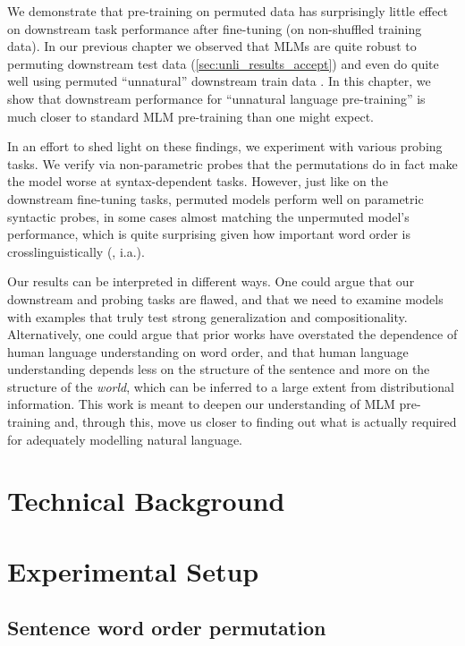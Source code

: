 \documentclass[letterpaper, 12pt]{report}
\begin{document}
We demonstrate that pre-training on permuted data has surprisingly little effect on downstream task performance after fine-tuning (on non-shuffled training data).
In our previous chapter we observed that MLMs are quite robust to permuting downstream test data (\autoref{sec:unli_results_accept}) and even do quite well using permuted ``unnatural'' downstream train data \cite{sinha2020b,gupta-etal-2021-bert}. In this chapter, we show that downstream performance for ``unnatural language pre-training'' is much closer to standard MLM pre-training than one might expect.

In an effort to shed light on these findings, we experiment with various probing tasks. We verify via non-parametric probes that the permutations do in fact make the model worse at syntax-dependent tasks. However, just like on the downstream fine-tuning tasks, permuted models perform well on parametric syntactic probes, in some cases almost matching the unpermuted model's performance, which is quite surprising given how important word order is crosslinguistically (\citealt{greenberg1963some, dryer1992greenbergian, cinque1999adverbs}, i.a.).

Our results can be interpreted in different ways.
One could argue that our downstream and probing tasks are flawed, and that we need to examine models with examples that truly test strong generalization and compositionality.
Alternatively, one could argue that prior works have overstated the dependence of human language understanding on word order, and that human language understanding depends less on the structure of the sentence and more on the structure of the \emph{world}, which can be inferred to a large extent from distributional information.
This work is meant to deepen our understanding of MLM pre-training and, through this, move us closer to finding out what is actually required for adequately modelling natural language.



\section{Technical Background}
\label{sec:mlm_bg}

\section{Experimental Setup}
\label{sec:mlm_experimental_setup}


\subsection{Sentence word order permutation}
\label{sec:mlm_sentence_permutation}
\end{document}
